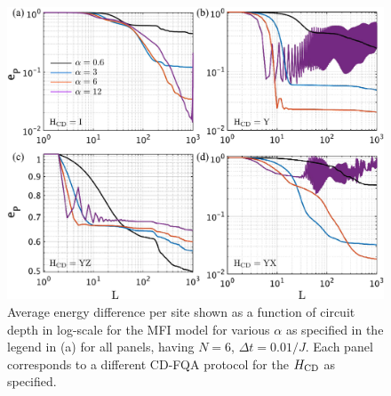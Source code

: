 \documentclass[twocolumn,aps,superscriptaddress,floatfix,longbibliography]{revtex4-2}
\begin{document}
\begin{figure}
    \centering
    \includegraphics[scale=0.11]{alpha_final.pdf}
    \caption{Average energy difference per site shown as a function of circuit depth in log-scale for the MFI model
    for %
    various $\alpha$ as specified in the legend
    in (a) for all panels, having $N=6$,
    $\Delta t = 0.01 / J$. %
    Each panel %
    corresponds to a different CD-FQA protocol
    for the $H_{\rm CD}$ as specified.
}\label{fig:alpha_final}
\end{figure}
\end{document}
